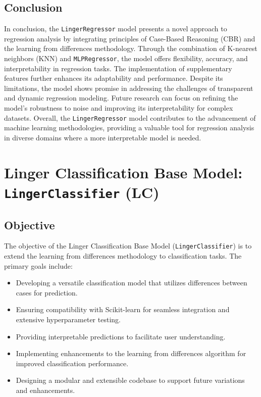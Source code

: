 \documentclass[a4paper, 12pt]{report}
\begin{document}
\subsection{Conclusion}
In conclusion, the \texttt{LingerRegressor} model presents a novel approach to regression analysis by integrating principles of Case-Based Reasoning (CBR) and the learning from differences methodology. 
Through the combination of K-nearest neighbors (KNN) and \texttt{MLPRegressor}, the model offers flexibility, accuracy, and interpretability in regression tasks. 
The implementation of supplementary features further enhances its adaptability and performance. Despite its limitations, the model shows promise in addressing the challenges 
of transparent and dynamic regression modeling. Future research can focus on refining the model's robustness to noise and improving its interpretability for complex datasets. 
Overall, the \texttt{LingerRegressor} model contributes to the advancement of machine learning methodologies, providing a valuable tool for regression analysis in diverse domains where a more interpretable model is needed.


\section{Linger Classification Base Model: \texttt{LingerClassifier} (LC)}
\label{sec:linger_classification_base_model}

\subsection{Objective}
The objective of the Linger Classification Base Model (\texttt{LingerClassifier}) is to extend the learning from differences methodology to 
classification tasks. The primary goals include:

\begin{itemize}
    \item Developing a versatile classification model that utilizes differences between cases for prediction.
    \item Ensuring compatibility with Scikit-learn for seamless integration and extensive hyperparameter testing.
    \item Providing interpretable predictions to facilitate user understanding.
    \item Implementing enhancements to the learning from differences algorithm for improved classification performance.
    \item Designing a modular and extensible codebase to support future variations and enhancements.
\end{itemize}
\end{document}
